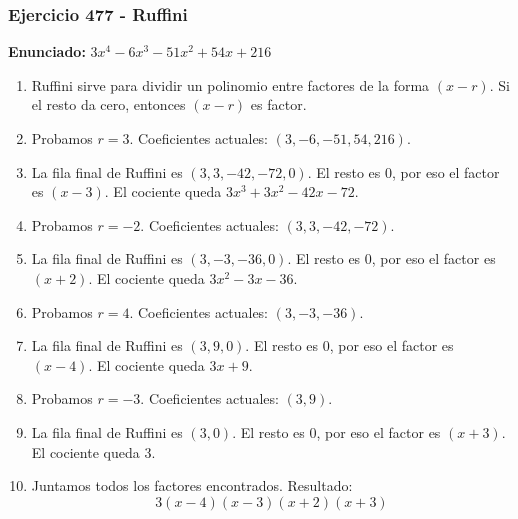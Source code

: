 \documentclass[11pt,a4paper]{article}
\begin{document}
\subsubsection*{Ejercicio 477 - Ruffini}
\textbf{Enunciado:} $ 3 x^{4} - 6 x^{3} - 51 x^{2} + 54 x + 216 $\par
\begin{enumerate}[leftmargin=2em]
\item Ruffini sirve para dividir un polinomio entre factores de la forma \((x-r)\). Si el resto da cero, entonces \((x-r)\) es factor.
\item Probamos \(r=3\). Coeficientes actuales: \((3, -6, -51, 54, 216)\).
\item La fila final de Ruffini es \((3, 3, -42, -72, 0)\). El resto es \(0\), por eso el factor es \((x-3)\). El cociente queda \(3 x^{3} + 3 x^{2} - 42 x - 72\).
\item Probamos \(r=-2\). Coeficientes actuales: \((3, 3, -42, -72)\).
\item La fila final de Ruffini es \((3, -3, -36, 0)\). El resto es \(0\), por eso el factor es \((x+2)\). El cociente queda \(3 x^{2} - 3 x - 36\).
\item Probamos \(r=4\). Coeficientes actuales: \((3, -3, -36)\).
\item La fila final de Ruffini es \((3, 9, 0)\). El resto es \(0\), por eso el factor es \((x-4)\). El cociente queda \(3 x + 9\).
\item Probamos \(r=-3\). Coeficientes actuales: \((3, 9)\).
\item La fila final de Ruffini es \((3, 0)\). El resto es \(0\), por eso el factor es \((x+3)\). El cociente queda \(3\).
\item Juntamos todos los factores encontrados. Resultado: \[\boxed{3 \left(x - 4\right) \left(x - 3\right) \left(x + 2\right) \left(x + 3\right)}\]
\end{enumerate}

\vspace{0.2cm}
\end{document}
